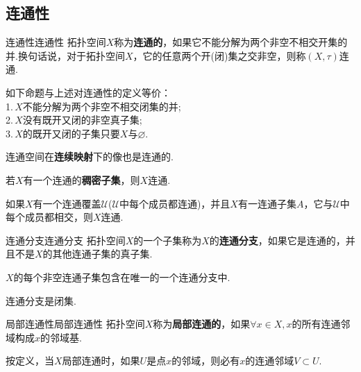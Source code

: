 \documentclass{ctexart}
\begin{document}
\subsection{连通性}
\begin{定义}{连通性}{连通性}
	拓扑空间$X$称为\textbf{连通的}，如果它不能分解为两个非空不相交开集的并.换句话说，对于拓扑空间$X$，它的任意两个开(闭)集之交非空，则称$(X,\tau)$连通.
\end{定义}
\begin{命题}{}{}
	如下命题与上述对连通性的定义等价：\\
	1.\,$X$不能分解为两个非空不相交闭集的并;\\
	2.\,$X$没有既开又闭的非空真子集;\\
	3.\,$X$的既开又闭的子集只要$X$与$\varnothing.$
\end{命题}
\begin{命题}{}{}
	连通空间在\textbf{连续映射}下的像也是连通的.
\end{命题}
\begin{命题}{}{}
	若$X$有一个连通的\textbf{稠密子集}，则$X$连通.
\end{命题}
\begin{命题}{}{}
	如果$X$有一个连通覆盖$\mathscr{U}$($\mathscr{U}$中每个成员都连通)，并且$X$有一连通子集$A$，它与$\mathscr{U}$中每个成员都相交，则$X$连通.
\end{命题}
\begin{定义}{连通分支}{连通分支}
	拓扑空间$X$的一个子集称为$X$的\textbf{连通分支}，如果它是连通的，并且不是$X$的其他连通子集的真子集.
\end{定义}
\begin{命题}{}{}
	$X$的每个非空连通子集包含在唯一的一个连通分支中.
\end{命题}
\begin{命题}{}{}
	连通分支是闭集.
\end{命题}
\begin{定义}{局部连通性}{局部连通性}
	拓扑空间$X$称为\textbf{局部连通的}，如果$\forall x \in X,x$的所有连通邻域构成$x$的邻域基.
\end{定义}
\begin{提示}
	按定义，当$X$局部连通时，如果$U$是点$x$的邻域，则必有$x$的连通邻域$V \subset U.$
\end{提示}
\end{document}
